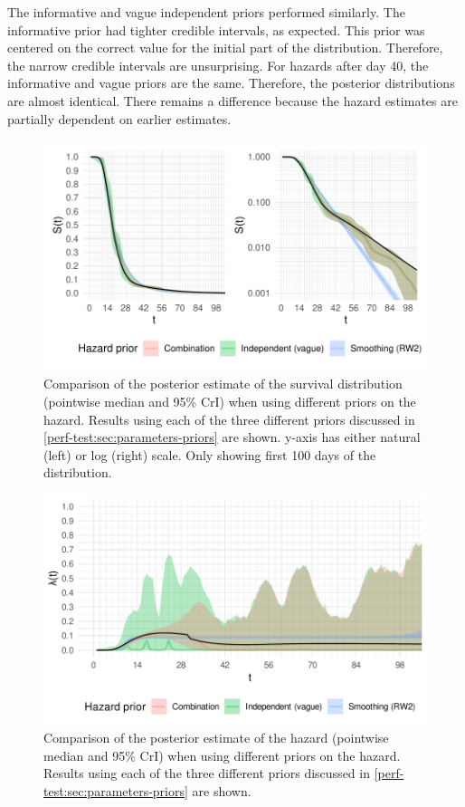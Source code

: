 \documentclass[thesis.tex]{subfiles}
\begin{document}
The informative and vague independent priors performed similarly.
The informative prior had tighter credible intervals, as expected.
This prior was centered on the correct value for the initial part of the distribution.
Therefore, the narrow credible intervals are unsurprising.
For hazards after day 40, the informative and vague priors are the same.
Therefore, the posterior distributions are almost identical.
There remains a difference because the hazard estimates are partially dependent on earlier estimates.

\begin{figure}
  \centering \includegraphics{cis-perfect-testing/survival-results}
  \caption[Comparison of survival function estimates under different priors]{Comparison of the posterior estimate of the survival distribution (pointwise median and 95\% CrI) when using different priors on the hazard. Results using each of the three different priors discussed in \cref{perf-test:sec:parameters-priors} are shown. y-axis has either natural (left) or log (right) scale. Only showing first 100 days of the distribution. \label{perf-test:fig:survival-results}}
\end{figure}

\begin{figure}
  \centering \includegraphics{cis-perfect-testing/hazard-results}
  \caption[Comparison of hazard estimates under different priors]{Comparison of the posterior estimate of the hazard (pointwise median and 95\% CrI) when using different priors on the hazard. Results using each of the three different priors discussed in \cref{perf-test:sec:parameters-priors} are shown. \label{perf-test:fig:hazard-results}}
\end{figure}
\end{document}

